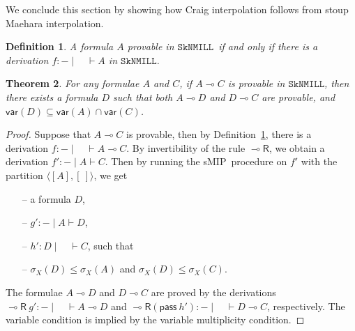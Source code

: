 \documentclass[sn-mathphys-num]{sn-jnl}%
\newcommand{\vd}{\vdash}
\newcommand{\pass}{\mathsf{pass}}
\newcommand{\lolli}{\multimap}
\newcommand{\lright}{{\lolli}\mathsf{R}}
\newcommand{\SkNMILL}{$\mathtt{SkNMILL}$}
\newcommand{\mf}[1]{\mathsf{#1}}
\newcommand{\gs}[1]{\sigma_{X} (#1)}
\newcommand{\vars}[1]{\mf{var} (#1)}
\newcommand{\sMIP}{\textsf{sMIP}}
\theoremstyle{thmstyleone}%
\newtheorem{theorem}{Theorem}%
\theoremstyle{thmstyletwo}%
\newtheorem{lemma}[theorem]{Lemma}
\theoremstyle{thmstylethree}%
\newtheorem{definition}[theorem]{Definition}%
\begin{document}
We conclude this section by showing how Craig interpolation follows from stoup Maehara interpolation.
\begin{definition}\label{def:provable}
  A formula $A$  provable in \SkNMILL\ if and only if there is a derivation $f : {-} \mid \quad \vd A$ in \SkNMILL.
\end{definition}
\begin{theorem}\label{thm:craig:intrp}
  For any formulae $A$ and $C$, if $A \lolli C$ is provable in \SkNMILL, then there exists a formula $D$ such that both $A \lolli D$ and $D \lolli C$ are provable, and $\vars{D} \subseteq \vars{A} \cap \vars{C}$.
\end{theorem}
\begin{proof}
  Suppose that $A \lolli C$ is provable, then by Definition~\ref{def:provable}, there is a derivation $f : {-} \mid \quad \vd A \lolli C$.
  By invertibility of the rule $\lright$, we obtain a derivation $f' : {-} \mid A \vd C$.
  Then by running the \sMIP~procedure on $f'$ with the partition $\langle [A ], [\ ]\rangle$, we get  
  \begin{itemize}
    \item[--]  a formula $D$,
    \item[--] $g': {-} \mid A \vd D$,
    \item[--] $h': D \mid \quad \vd C$, such that
    \item[--] $\gs{D} \leq \gs{A} $ and $\gs{D} \leq \gs{C}$.
  \end{itemize}
  The formulae $A \lolli D$ and $D \lolli C$ are proved by the derivations $\lright \ g' : {-} \mid \quad \vd A \lolli D$ and $\lright (\pass \ h') : {-} \mid \quad \vd D \lolli C$, respectively.
  The variable condition is implied by the variable multiplicity condition.
\end{proof}
\end{document}
